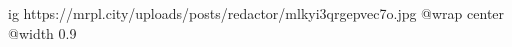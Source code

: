  
 
 
 
 

\ifcmt
  ig https://mrpl.city/uploads/posts/redactor/mlkyi3qrgepvec7o.jpg
  @wrap center
  @width 0.9
\fi
